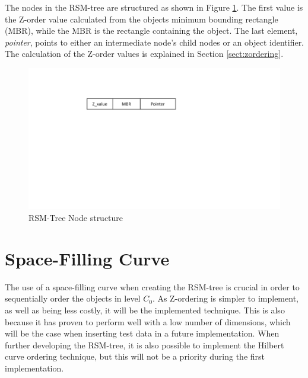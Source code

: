 \noindent
The nodes in the RSM-tree are structured as shown in Figure \ref{fig:nodeRSM}. The first value is the Z-order value calculated from the objects minimum bounding rectangle (MBR), while the MBR is the rectangle containing the object. The last element, \emph{pointer}, points to either an intermediate node's child nodes or an object identifier. The calculation of the Z-order values is explained in Section \ref{sect:zordering}. 

\begin{figure}[ht]
    \centering
    \includegraphics[scale=0.5]{figures/node_RSM.pdf}
    \caption{RSM-Tree Node structure}
    \label{fig:nodeRSM}
\end{figure}

\section{Space-Filling Curve}
\label{sect:ordering}
The use of a space-filling curve when creating the RSM-tree is crucial in order to sequentially order the objects in level $C_0$. As Z-ordering is simpler to implement, as well as being less costly, it will be the implemented technique. This is also because it has proven to perform well with a low number of dimensions\cite{IrregularSpace}, which will be the case when inserting test data in a future implementation. When further developing the RSM-tree, it is also possible to implement the Hilbert curve ordering technique, but this will not be a priority during the first implementation. 

